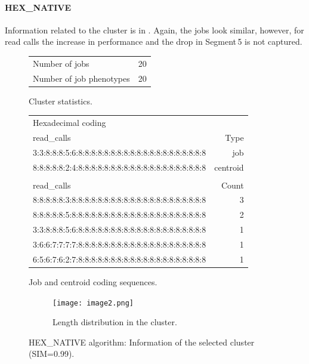 \documentclass{jhps}
\begin{document}
\FloatBarrier
\paragraph{HEX\_NATIVE}
Information related to the cluster is in .
Again, the jobs look similar, however, for read calls the increase in performance and the drop in Segment\,5 is not captured.

\begin{figure}
	\begin{subtable}{\textwidth}
		\centering
		\begin{tabular}{ll}
			Number of jobs & 20 \\
			Number of job phenotypes & 20 \\
		\end{tabular}
		\caption{Cluster statistics.}
		\label{cluster:use_case:hex_native:stats}
	\end{subtable}
	\medskip
	\begin{subtable}{\textwidth}
		\centering
		\begin{tiny}
			\begin{tabular}{l|r}
				\rowcolor{tblhead}
				Hexadecimal coding & \\
				\rowcolor{tblhead}
				read\_calls                                           & Type     \\
				\hline
				3:3:8:8:8:5:6:8:8:8:8:8:8:8:8:8:8:8:8:8:8:8:8:8:8:8:8 & job      \\
				8:8:8:8:8:2:4:8:8:8:8:8:8:8:8:8:8:8:8:8:8:8:8:8:8:8:8 & centroid \\
				\multicolumn{2}{l}{}\\
				\rowcolor{tblhead}
				read\_calls                                           & Count    \\
				\hline
				8:8:8:8:8:3:8:8:8:8:8:8:8:8:8:8:8:8:8:8:8:8:8:8:8:8:8 & 3        \\
				8:8:8:8:8:5:8:8:8:8:8:8:8:8:8:8:8:8:8:8:8:8:8:8:8:8:8 & 2        \\
				3:3:8:8:8:5:6:8:8:8:8:8:8:8:8:8:8:8:8:8:8:8:8:8:8:8:8 & 1        \\
				3:6:6:7:7:7:7:8:8:8:8:8:8:8:8:8:8:8:8:8:8:8:8:8:8:8:8 & 1        \\
				6:5:6:7:6:2:7:8:8:8:8:8:8:8:8:8:8:8:8:8:8:8:8:8:8:8:8 & 1        \\
			\end{tabular}
		\end{tiny}
		\caption{Job and centroid coding sequences.}
		\label{cluster:use_case:hex_native:job_centroid}
	\end{subtable}
	\medskip
	\begin{subfigure}{\textwidth}
		\centering
		\texttt{[image: image2.png]}
		\caption{Length distribution in the cluster.}
		\label{cluster:use_case:hex_native:length}
	\end{subfigure}
	\caption{HEX\_NATIVE algorithm: Information of the selected cluster (SIM=0.99).}
	\label{cluster:use_case:hex_native}
\end{figure}
\end{document}
